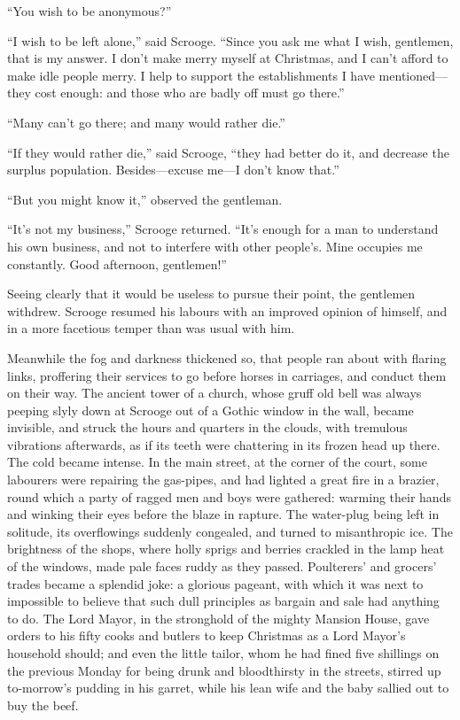 \documentclass[paper=a5,BCOR=15mm,twoside,DIV=15,headinclude=off,12pt,chapterprefix=off,openany,headings=huge]{scrbook} %
\begin{document}
\enquote{You wish to be anonymous?}

\enquote{I wish to be left alone,} said Scrooge. \enquote{Since you ask me what I wish, gentlemen, that is my answer. I don't make merry myself at Christmas, and I can't afford to make idle people merry. I help to support the establishments I have mentioned—they cost enough: and those who are badly off must go there.}

\enquote{Many can't go there; and many would rather die.}

\enquote{If they would rather die,} said Scrooge, \enquote{they had better do it, and decrease the surplus population. Besides—excuse me—I don't know that.}

\enquote{But you might know it,} observed the gentleman.

\enquote{It's not my business,} Scrooge returned. \enquote{It's enough for a man to understand his own business, and not to interfere with other people's. Mine occupies me constantly. Good afternoon, gentlemen!}

Seeing clearly that it would be useless to pursue their point, the gentlemen withdrew. Scrooge resumed his labours with an improved opinion of himself, and in a more facetious temper than was usual with him.

Meanwhile the fog and darkness thickened so, that people ran about with flaring links, proffering their services to go before horses in carriages, and conduct them on their way. The ancient tower of a church, whose gruff old bell was always peeping slyly down at Scrooge out of a Gothic window in the wall, became invisible, and struck the hours and quarters in the clouds, with tremulous vibrations afterwards, as if its teeth were chattering in its frozen head up there. The cold became intense. In the main street, at the corner of the court, some labourers were repairing the gas-pipes, and had lighted a great fire in a brazier, round which a party of ragged men and boys were gathered: warming their hands and winking their eyes before the blaze in rapture. The water-plug being left in solitude, its overflowings suddenly congealed, and turned to misanthropic ice. The brightness of the shops, where holly sprigs and berries crackled in the lamp heat of the windows, made pale faces ruddy as they passed. Poulterers' and grocers' trades became a splendid joke: a glorious pageant, with which it was next to impossible to believe that such dull principles as bargain and sale had anything to do. The Lord Mayor, in the stronghold of the mighty Mansion House, gave orders to his fifty cooks and butlers to keep Christmas as a Lord Mayor's household should; and even the little tailor, whom he had fined five shillings on the previous Monday for being drunk and bloodthirsty in the streets, stirred up to-morrow's pudding in his garret, while his lean wife and the baby sallied out to buy the beef.
\end{document}
